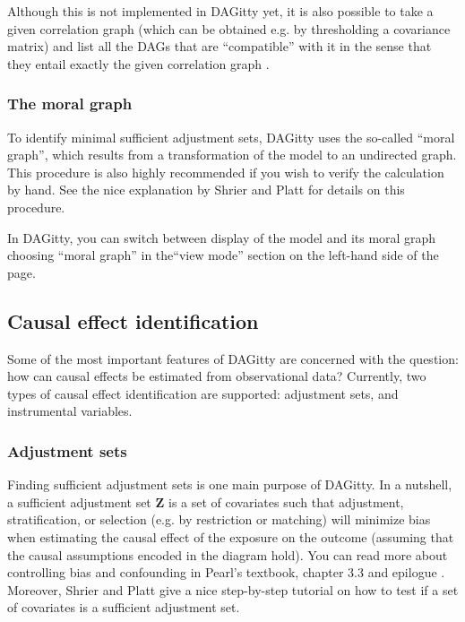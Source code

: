 \documentclass[a4paper]{article} %
\newcommand{\pp}{{\sc DAG}itty\xspace}
\begin{document}
Although this is not implemented in \pp yet, it is also possible to take a given 
correlation graph (which can be obtained e.g. by thresholding a covariance matrix) and 
list all the DAGs that are ``compatible'' with it in the sense that they entail exactly
the given correlation graph \cite{textor15_uai}.

\subsubsection{The moral graph}

To identify minimal sufficient adjustment sets, \pp uses the so-called ``moral graph'',
which results from a transformation of the model to an undirected graph.
This procedure is also highly recommended if you wish to verify the calculation by hand.
See the nice explanation by Shrier and Platt \cite{ShrierP2008} for details on this
procedure.  

In \pp, you can switch between display of the model and its moral graph 
choosing ``moral graph'' in the``view mode'' section on the left-hand
side of the page.

\subsection{Causal effect identification}

Some of the most important features of \pp are concerned with the question: how
can causal effects be estimated from observational data? Currently, two types of causal
effect identification are supported: adjustment sets, and instrumental variables.

\subsubsection{Adjustment sets}

\label{sec:adjustment}

Finding sufficient adjustment sets is one main purpose 
of \pp. In a nutshell, a sufficient adjustment
set $\mathbf{Z}$ is a set of covariates such that adjustment,
stratification, or selection (e.g. by restriction or 
matching) will minimize bias when estimating the causal 
effect of the exposure on the outcome (assuming that
the causal assumptions encoded in the diagram hold). 
You can read more about controlling bias and confounding in Pearl's textbook, 
chapter 3.3 and epilogue \cite{Pearl2009}. 
Moreover, Shrier and Platt \cite{ShrierP2008} 
give a nice step-by-step tutorial on how to test if a set of covariates
is a sufficient adjustment set.
\end{document}
